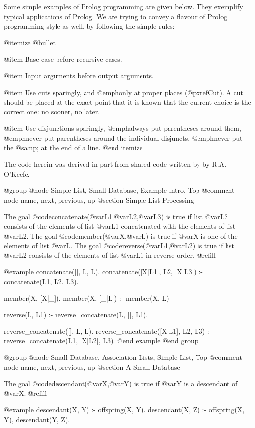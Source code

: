 {{{{{Some simple examples of Prolog programming are given below.  They
exemplify typical applications of Prolog.  We are trying to convey a
flavour of Prolog programming style as well, by following the simple
rules:

@itemize @bullet

@item
Base case before recursive cases.

@item
Input arguments before output arguments.

@item
Use cuts sparingly, and @emph{only} at proper places (@pxref{Cut}).  A
cut should be placed at the exact point that it is known that the
current choice is the correct one: no sooner, no later.

@item
Use disjunctions sparingly, @emph{always} put parentheses around
them, @emph{never} put parentheses around the individual disjuncts,
@emph{never} put the @samp{;} at the end of a line.
@end itemize

The code herein was derived in part from shared code written by by R.A.
O'Keefe.

@group
@node Simple List, Small Database, Example Intro, Top
@comment  node-name,  next,  previous,  up
@section Simple List Processing

The goal @code{concatenate(@var{L1},@var{L2},@var{L3})} is true if list
@var{L3} consists of the elements of list @var{L1} concatenated with the
elements of list @var{L2}.  The goal @code{member(@var{X},@var{L})} is true
if @var{X} is one of the elements of list @var{L}.  The goal
@code{reverse(@var{L1},@var{L2})} is true if list @var{L2} consists of the
elements of list @var{L1} in reverse order. @refill

@example
concatenate([], L, L).
concatenate([X|L1], L2, [X|L3]) :- concatenate(L1, L2, L3).

member(X, [X|_]).
member(X, [_|L]) :- member(X, L).

reverse(L, L1) :- reverse_concatenate(L, [], L1).

reverse_concatenate([], L, L).
reverse_concatenate([X|L1], L2, L3) :-
        reverse_concatenate(L1, [X|L2], L3).
@end example
@end group

@group
@node Small Database, Association Lists, Simple List, Top
@comment  node-name,  next,  previous,  up
@section A Small Database

The goal @code{descendant(@var{X},@var{Y})} is true if @var{Y} is a
descendant of @var{X}. @refill

@example
descendant(X, Y) :- offspring(X, Y).
descendant(X, Z) :- offspring(X, Y), descendant(Y, Z).

}}}}}
